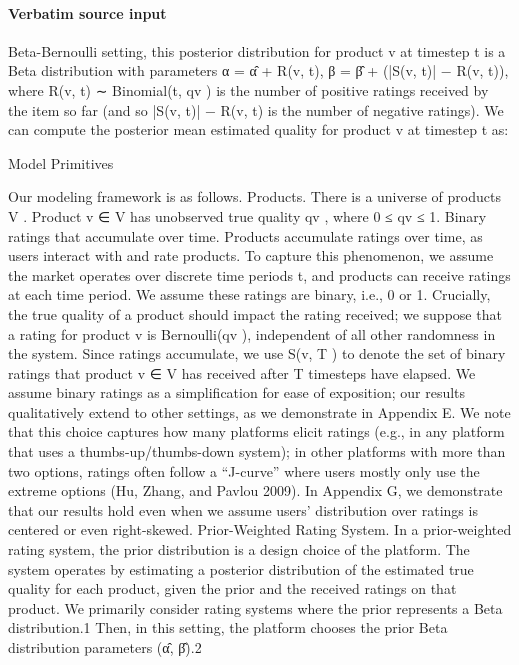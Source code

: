 \documentclass[10pt]{article}
\begin{document}
\paragraph{Verbatim source input}
\begin{ReviewVerbatim}
Beta-Bernoulli setting, this posterior distribution for product
v at timestep t is a Beta distribution with parameters
α = α̂ + R(v, t),
β = β̂ + (|S(v, t)| − R(v, t)),
where R(v, t) ∼ Binomial(t, qv ) is the number of positive
ratings received by the item so far (and so |S(v, t)| − R(v, t)
is the number of negative ratings). We can compute the posterior mean estimated quality for product v at timestep t as:

Model Primitives

Our modeling framework is as follows.
Products. There is a universe of products V . Product v ∈
V has unobserved true quality qv , where 0 ≤ qv ≤ 1.
Binary ratings that accumulate over time. Products accumulate ratings over time, as users interact with and rate
products. To capture this phenomenon, we assume the market operates over discrete time periods t, and products can
receive ratings at each time period. We assume these ratings
are binary, i.e., 0 or 1.
Crucially, the true quality of a product should impact the
rating received; we suppose that a rating for product v is
Bernoulli(qv ), independent of all other randomness in the
system. Since ratings accumulate, we use S(v, T ) to denote
the set of binary ratings that product v ∈ V has received
after T timesteps have elapsed.
We assume binary ratings as a simplification for ease of
exposition; our results qualitatively extend to other settings,
as we demonstrate in Appendix E. We note that this choice
captures how many platforms elicit ratings (e.g., in any platform that uses a thumbs-up/thumbs-down system); in other
platforms with more than two options, ratings often follow a
“J-curve” where users mostly only use the extreme options
(Hu, Zhang, and Pavlou 2009). In Appendix G, we demonstrate that our results hold even when we assume users’ distribution over ratings is centered or even right-skewed.
Prior-Weighted Rating System. In a prior-weighted rating system, the prior distribution is a design choice of the
platform. The system operates by estimating a posterior distribution of the estimated true quality for each product, given
the prior and the received ratings on that product.
We primarily consider rating systems where the prior represents a Beta distribution.1 Then, in this setting, the platform chooses the prior Beta distribution parameters (α̂, β̂).2

\end{ReviewVerbatim}
\end{document}
